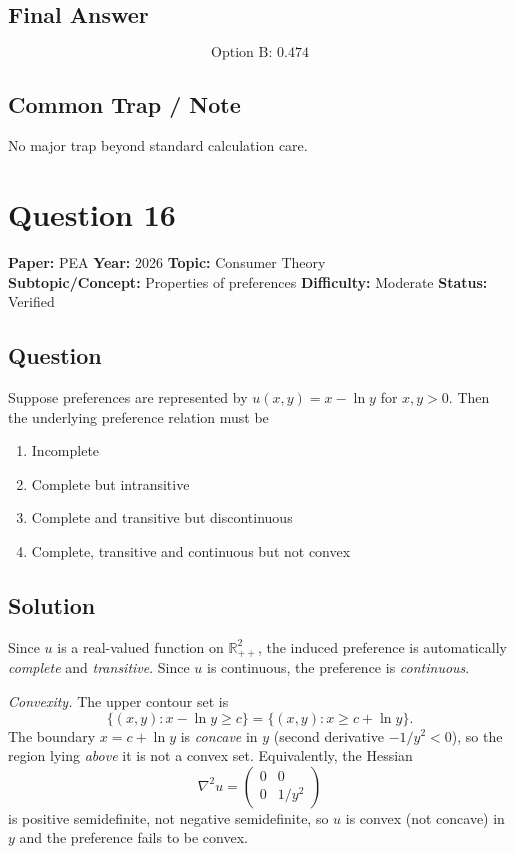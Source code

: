 \documentclass[11pt]{article}
\begin{document}
\subsection*{Final Answer}
\[
\boxed{\text{Option B: } 0.474}
\]

\subsection*{Common Trap / Note}
No major trap beyond standard calculation care.

\section*{Question 16}
\textbf{Paper:} PEA \quad \textbf{Year:} 2026 \quad \textbf{Topic:} Consumer Theory \\
\textbf{Subtopic/Concept:} Properties of preferences \quad
\textbf{Difficulty:} Moderate \quad \textbf{Status:} Verified

\subsection*{Question}
Suppose preferences are represented by $u(x,y) = x - \ln y$ for $x,y > 0$. Then the underlying preference relation must be
\begin{enumerate}[label=(\Alph*)]
\item Incomplete
\item Complete but intransitive
\item Complete and transitive but discontinuous
\item Complete, transitive and continuous but not convex
\end{enumerate}

\subsection*{Solution}
Since $u$ is a real-valued function on $\mathbb{R}_{++}^2$, the induced
preference is automatically \emph{complete} and \emph{transitive}. Since $u$ is
continuous, the preference is \emph{continuous}.

\emph{Convexity.} The upper contour set is
\[
\{(x,y): x - \ln y \ge c\} = \{(x,y): x \ge c + \ln y\}.
\]
The boundary $x = c + \ln y$ is \emph{concave} in $y$ (second derivative
$-1/y^2 < 0$), so the region lying \emph{above} it is not a convex set.
Equivalently, the Hessian
\[
\nabla^2 u = \begin{pmatrix} 0 & 0 \\ 0 & 1/y^2 \end{pmatrix}
\]
is positive semidefinite, not negative semidefinite, so $u$ is convex (not concave) in $y$ and the preference fails to be convex.
\end{document}
